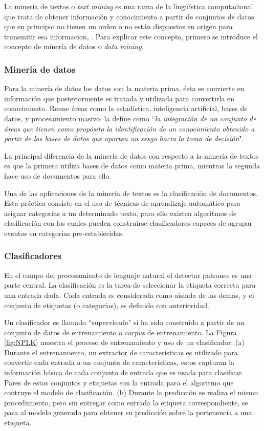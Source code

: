 La minería de textos o \textit{text mining} es una rama de la lingüística computacional que trata de obtener información y conocimiento a partir de conjuntos de datos que en principio no tienen un orden o no están dispuestos en origen para transmitir esa informacion, \citep{IvanFernandez}. Para explicar este concepto, primero se introduce el concepto de minería de datos o \textit{data mining}.

\subsubsection*{Minería de datos}
\label{subsubsec:dataMining}

Para la minería de datos los datos son la materia prima, ésta se convierte en información que posteriormente es tratada y utilizada para convertirla en conocimiento. Reune áreas como la estadística, inteligencia artificial, bases de datos, y procesamiento masivo. \citep{LuisMolina} la define como ``\textit{la integración de un conjunto de áreas que tienen como propósito la identificación de un conocimiento obtenido a partir de las bases de datos que aporten un sesgo hacia la toma de decisión}".

La principal diferencia de la minería de datos con respecto a la minería de textos es que la primera utiliza bases de datos como materia prima, mientras la segunda hace uso de documentos para ello.

Una de las aplicaciones de la minería de textos es la clasificación de documentos. Esta práctica consiste en el uso de técnicas de aprendizaje automático para asignar categorías a un determinado texto, para ello existen algoritmos de clasificación con los cuales pueden construirse clasificadores capaces de agrupar eventos en categorias pre-establecidas.

\subsubsection*{Clasificadores}
\label{subsubsec:Classifiers}

En el campo del procesamiento de lenguaje natural el detectar patrones es una parte central. La clasificación es la tarea de seleccionar la etiqueta correcta para una entrada dada. Cada entrada es considerada como aislada de las demás, y el conjunto de etiquetas (o categorías), es definido con anterioridad.

Un clasificador es llamado ``supervisado" si ha sido construido a partir de un conjunto de datos de entrenamiento o \textit{corpus} de entrenamiento. La Figura \ref{fig:NPLK} muestra el proceso de entrenamiento y uso de un clasificador. (a) Durante el entrenamiento, un extractor de características es utilizado para convertir cada entrada a un conjunto de características, estos capturan la información básica de cada conjunto de entrada que es usada para clasificar. Pares de estos conjuntos y etiquetas son la entrada para el algoritmo que contruye el modelo de clasificación. (b) Durante la predicción se realiza el mismo procedimiento, pero sin entregar como entrada la etiqueta correspondiente, se pasa al modelo generado para obtener su predicción sobre la pertenencia a una etiqueta.

